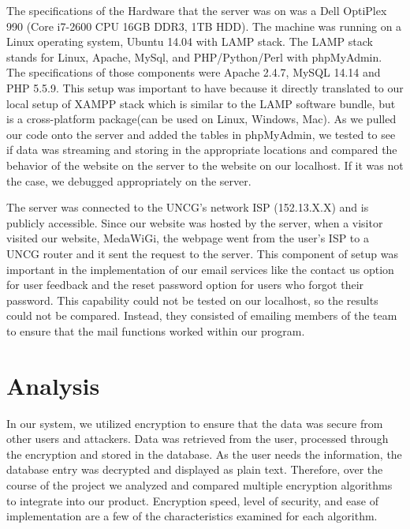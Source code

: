 \documentclass[twocolumn,12pt]{article}
\begin{document}
The specifications of the Hardware that the server was on was a Dell OptiPlex 990 (Core i7-2600 CPU 16GB DDR3, 1TB HDD). The machine was running on a Linux operating system, Ubuntu 14.04 with LAMP stack. The LAMP stack stands for Linux, Apache, MySql, and PHP/Python/Perl with phpMyAdmin. The specifications of those components were  Apache 2.4.7, MySQL 14.14 and PHP 5.5.9. This setup was important to have because it directly translated to our local setup of XAMPP stack which is similar to the LAMP software bundle, but is a cross-platform package(can be used on Linux, Windows, Mac). As we pulled our code onto the server and added the tables in phpMyAdmin, we tested to see if data was streaming and storing in the appropriate locations and compared the behavior of the website on the server to the website on our localhost.  If it was not the case, we debugged appropriately on the server.

The server was connected to the UNCG’s network ISP (152.13.X.X) and is publicly accessible. Since our website was hosted by the server, when a visitor visited our website, MedaWiGi, the webpage went from the user’s ISP to a UNCG router and it sent the request to the server. This component of setup was important in the implementation of our email services like the contact us option for user feedback and the reset password option for users who forgot their password. This capability could not be tested on our localhost, so the results could not be compared. Instead, they consisted of emailing members of the team to ensure that the mail functions worked within our program.

\section{Analysis}
In our system, we utilized encryption to ensure that the data was secure from other users and attackers. Data was retrieved from the user, processed through the encryption and stored in the database. As the user needs the information, the database entry was decrypted and displayed as plain text. Therefore, over the course of the project we analyzed and compared multiple encryption algorithms to integrate into our product. Encryption speed, level of security, and ease of implementation are a few of the characteristics examined for each algorithm.
\end{document}
